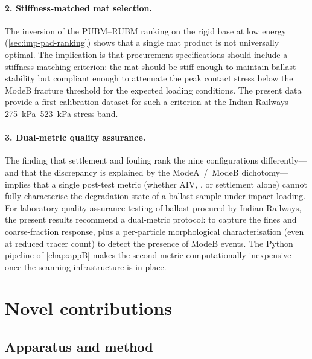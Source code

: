 \paragraph{2. Stiffness-matched mat selection.}
The inversion of the \gls{PUBM}--\gls{RUBM} ranking on the rigid base
at low energy (\cref{sec:imp-pad-ranking}) shows that a single mat
product is not universally optimal. The implication is that procurement
specifications should include a stiffness-matching criterion: the mat
should be stiff enough to maintain ballast stability but compliant enough
to attenuate the peak contact stress below the \gls{ModeB} fracture
threshold for the expected loading conditions. The present data provide
a first calibration dataset for such a criterion at the Indian Railways
\SIrange{275}{523}{\kilo\pascal} stress band.

\paragraph{3. Dual-metric quality assurance.}
The finding that settlement and fouling rank the nine configurations
differently---and that the discrepancy is explained by the
\gls{ModeA}~/~\gls{ModeB} dichotomy---implies that a single post-test
metric (whether \gls{AIV}, \FIIN, or settlement alone) cannot fully
characterise the degradation state of a ballast sample under impact
loading. For laboratory quality-assurance testing of ballast procured by
Indian Railways, the present results recommend a dual-metric protocol:
\FIIN{} to capture the fines and coarse-fraction response, plus a
per-particle morphological characterisation (even at reduced tracer count)
to detect the presence of \gls{ModeB} events. The Python pipeline of
\cref{chap:appB} makes the second metric computationally inexpensive once
the scanning infrastructure is in place.

\section{Novel contributions}
\label{sec:concl-novel}

\subsection{Apparatus and method}
\label{sec:concl-novel-apparatus}

